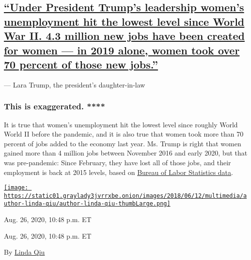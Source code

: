 \hypertarget{under-president-trumps-leadership-womens-unemployment-hit-the-lowest-level-since-world-war-ii-43-million-new-jobs-have-been-created-for-women--in-2019-alone-women-took-over-70-percent-of-those-new-jobs}{%
\subsection{\texorpdfstring{\protect\hyperlink{under-president-trumps-leadership-womens-unemployment-hit-the-lowest-level-since-world-war-ii-4-3-million-new-jobs-have-been-cre}{``Under
President Trump's leadership women's unemployment hit the lowest level
since World War II. 4.3 million new jobs have been created for women ---
in 2019 alone, women took over 70 percent of those new
jobs.''}}{``Under President Trump's leadership women's unemployment hit the lowest level since World War II. 4.3 million new jobs have been created for women --- in 2019 alone, women took over 70 percent of those new jobs.''}}\label{under-president-trumps-leadership-womens-unemployment-hit-the-lowest-level-since-world-war-ii-43-million-new-jobs-have-been-created-for-women--in-2019-alone-women-took-over-70-percent-of-those-new-jobs}}

--- Lara Trump, the president's daughter-in-law

\hypertarget{this-is-exaggerated--}{%
\subsubsection{This is exaggerated. **** }\label{this-is-exaggerated--}}

It is true that women's unemployment hit the lowest level since roughly
World World II before the pandemic, and it is also true that women took
more than 70 percent of jobs added to the economy last year. Ms. Trump
is right that women gained more than 4 million jobs between November
2016 and early 2020, but that was pre-pandemic: Since February, they
have lost all of those jobs, and their employment is back at 2015
levels, based on
\href{https://fred.stlouisfed.org/series/CES0000000010}{Bureau of Labor
Statistics data}.

\href{https://www.nytimes3xbfgragh.onion/by/linda-qiu}{\texttt{[image: https://static01.graylady3jvrrxbe.onion/images/2018/06/12/multimedia/author-linda-qiu/author-linda-qiu-thumbLarge.png]}}

Aug. 26, 2020, 10:48 p.m. ET

Aug. 26, 2020, 10:48 p.m. ET

By \href{https://www.nytimes3xbfgragh.onion/by/linda-qiu}{Linda Qiu}


